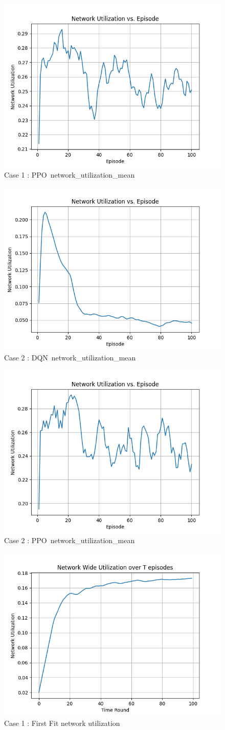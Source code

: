 \documentclass[conference]{IEEEtran}
\begin{document}
\begin{figure}[H]
    \centering
    \includegraphics[width=0.5\linewidth]{ppo_fixed_uti.png}
    \caption{Case 1 : PPO\ network\_utilization\_mean}
    \label{fig:enter-label}
\end{figure}

\begin{figure}[H]
    \centering
    \includegraphics[width=0.5\linewidth]{dqn_random_uti.png}
    \caption{Case 2 : DQN\ network\_utilization\_mean}
    \label{fig:enter-label}
\end{figure}

\begin{figure}[H]
    \centering
    \includegraphics[width=0.5\linewidth]{ppo_random_uti.png}
    \caption{Case 2 : PPO\ network\_utilization\_mean}
    \label{fig:enter-label}
\end{figure}

\begin{figure}[H]
    \centering
    \includegraphics[width=0.5\linewidth]{FirstFit_ut1.png}
    \caption{Case 1 : First Fit network utilization}
    \label{fig:enter-label}
\end{figure}
\end{document}
